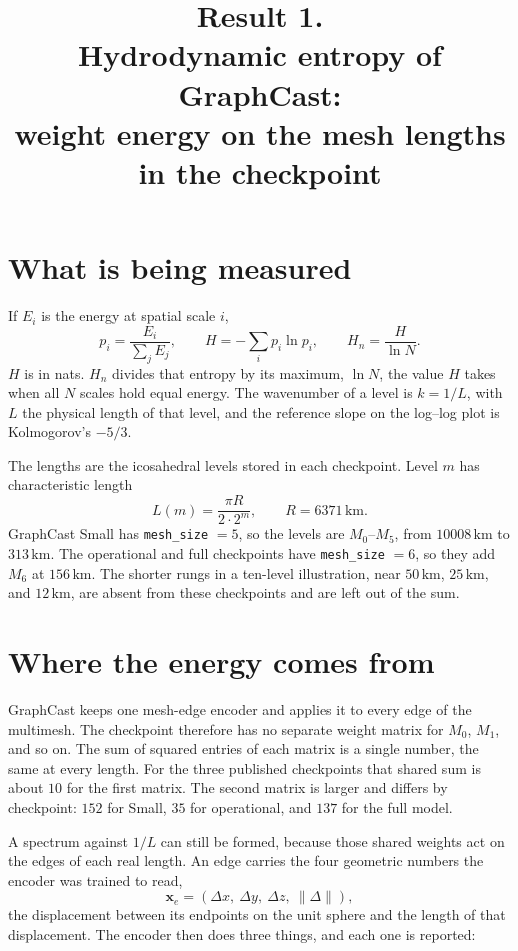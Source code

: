 \documentclass[11pt]{article}
\title{Result 1.\\
Hydrodynamic entropy of GraphCast:\\
weight energy on the mesh lengths in the checkpoint}
\author{}
\date{}
\begin{document}
\maketitle

\section{What is being measured}

If \(E_i\) is the energy at spatial scale \(i\),
\[
p_i = \frac{E_i}{\sum_j E_j},
\qquad
H = -\sum_i p_i \ln p_i,
\qquad
H_n = \frac{H}{\ln N}.
\]
\(H\) is in nats. \(H_n\) divides that entropy by its maximum, \(\ln N\), the value \(H\) takes when all \(N\) scales hold equal energy. The wavenumber of a level is \(k = 1/L\), with \(L\) the physical length of that level, and the reference slope on the log--log plot is Kolmogorov's \(-5/3\).

The lengths are the icosahedral levels stored in each checkpoint. Level \(m\) has characteristic length
\[
L(m) = \frac{\pi R}{2 \cdot 2^{m}}, \qquad R = 6371\,\mathrm{km}.
\]
GraphCast Small has \texttt{mesh\_size} \(= 5\), so the levels are \(M_0\)--\(M_5\), from \(10008\,\mathrm{km}\) to \(313\,\mathrm{km}\). The operational and full checkpoints have \texttt{mesh\_size} \(= 6\), so they add \(M_6\) at \(156\,\mathrm{km}\). The shorter rungs in a ten-level illustration, near \(50\,\mathrm{km}\), \(25\,\mathrm{km}\), and \(12\,\mathrm{km}\), are absent from these checkpoints and are left out of the sum.

\section{Where the energy comes from}

GraphCast keeps one mesh-edge encoder and applies it to every edge of the multimesh. The checkpoint therefore has no separate weight matrix for \(M_0\), \(M_1\), and so on. The sum of squared entries of each matrix is a single number, the same at every length. For the three published checkpoints that shared sum is about \(10\) for the first matrix. The second matrix is larger and differs by checkpoint: \(152\) for Small, \(35\) for operational, and \(137\) for the full model.

A spectrum against \(1/L\) can still be formed, because those shared weights act on the edges of each real length. An edge carries the four geometric numbers the encoder was trained to read,
\[
\mathbf{x}_e = (\Delta x,\ \Delta y,\ \Delta z,\ \|\Delta\|),
\]
the displacement between its endpoints on the unit sphere and the length of that displacement. The encoder then does three things, and each one is reported:
\end{document}

